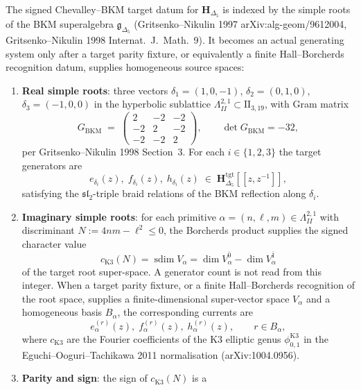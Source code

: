 \begin{theorem}
\label{thm:kcb-chevalley-bkm-generators}
The signed Chevalley--BKM target datum for $\mathbf{H}_{\Delta_5}$ is
indexed by the simple roots of the BKM superalgebra
$\mathfrak{g}_{\Delta_5}$ (Gritsenko--Nikulin 1997
\textup{arXiv:alg-geom/9612004}, Gritsenko--Nikulin 1998
\textup{Internat.~J.~Math.}~9). It becomes an actual generating system
only after a target parity fixture, or equivalently a finite
Hall--Borcherds recognition datum, supplies homogeneous source spaces:
\begin{enumerate}[label=\textup{(\roman*)}]
\item \textbf{Real simple roots}: three vectors
$\delta_{1}=(1,0,-1)$, $\delta_{2}=(0,1,0)$, $\delta_{3}=(-1,0,0)$ in
the hyperbolic sublattice
$\Lambda^{2,1}_{II}\subset \mathrm{II}_{3,19}$, with Gram matrix
\[
 G_{\mathrm{BKM}} \;=\;
 \begin{pmatrix}
 2 & -2 & -2\\
 -2 & 2 & -2\\
 -2 & -2 & 2
 \end{pmatrix},\qquad
 \det G_{\mathrm{BKM}} = -32,
\]
per Gritsenko--Nikulin 1998 Section~3. For each $i\in\{1,2,3\}$ the
target generators are
\[
 e_{\delta_i}(z),\; f_{\delta_i}(z),\; h_{\delta_i}(z)\;\in\;\mathbf{H}_{\Delta_5}^{\mathrm{tgt}}[[z, z^{-1}]],
\]
satisfying the $\mathfrak{sl}_2$-triple braid relations of the BKM
reflection along $\delta_i$.
\item \textbf{Imaginary simple roots}: for each primitive
$\alpha=(n,\ell,m)\in\Lambda^{2,1}_{II}$ with discriminant
$N := 4nm - \ell^2 \leq 0$, the Borcherds product supplies the signed
character value
\[
 c_{\mathrm{K3}}(N)
 =
 \operatorname{sdim}V_\alpha
 =
 \dim V_\alpha^{\overline{0}}-\dim V_\alpha^{\overline{1}}
\]
of the target root super-space. A generator count is not read from this
integer. When a target parity fixture, or a finite Hall--Borcherds
recognition of the root space, supplies a finite-dimensional super-vector
space $V_\alpha$ and a homogeneous basis $B_\alpha$, the corresponding
currents are
\[
 e^{(r)}_{\alpha}(z),\; f^{(r)}_{\alpha}(z),\;
 h^{(r)}_{\alpha}(z),\qquad r\in B_\alpha,
\]
where $c_{\mathrm{K3}}$ are the Fourier coefficients of the K3 elliptic
genus $\phi_{0,1}^{\mathrm{K3}}$ in the Eguchi--Ooguri--Tachikawa 2011
normalisation (\textup{arXiv:1004.0956}).
\item \textbf{Parity and sign}: the sign of $c_{\mathrm{K3}}(N)$ is a

\end{enumerate}
\end{theorem}
